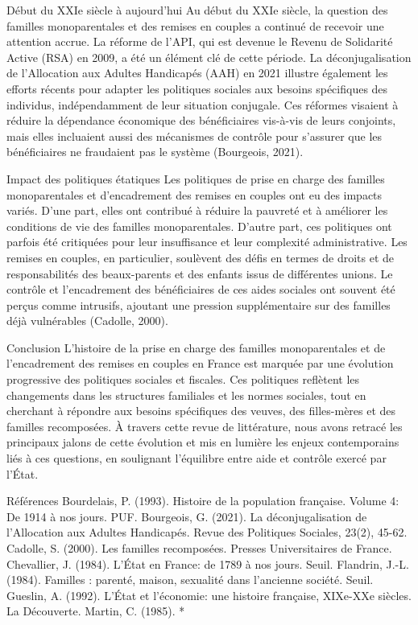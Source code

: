 \documentclass[
  12pt,
]{book}
\begin{document}
Début du XXIe siècle à aujourd'hui Au début du XXIe siècle, la question
des familles monoparentales et des remises en couples a continué de
recevoir une attention accrue. La réforme de l'API, qui est devenue le
Revenu de Solidarité Active (RSA) en 2009, a été un élément clé de cette
période. La déconjugalisation de l'Allocation aux Adultes Handicapés
(AAH) en 2021 illustre également les efforts récents pour adapter les
politiques sociales aux besoins spécifiques des individus,
indépendamment de leur situation conjugale. Ces réformes visaient à
réduire la dépendance économique des bénéficiaires vis-à-vis de leurs
conjoints, mais elles incluaient aussi des mécanismes de contrôle pour
s'assurer que les bénéficiaires ne fraudaient pas le système (Bourgeois,
2021).

Impact des politiques étatiques Les politiques de prise en charge des
familles monoparentales et d'encadrement des remises en couples ont eu
des impacts variés. D'une part, elles ont contribué à réduire la
pauvreté et à améliorer les conditions de vie des familles
monoparentales. D'autre part, ces politiques ont parfois été critiquées
pour leur insuffisance et leur complexité administrative. Les remises en
couples, en particulier, soulèvent des défis en termes de droits et de
responsabilités des beaux-parents et des enfants issus de différentes
unions. Le contrôle et l'encadrement des bénéficiaires de ces aides
sociales ont souvent été perçus comme intrusifs, ajoutant une pression
supplémentaire sur des familles déjà vulnérables (Cadolle, 2000).

Conclusion L'histoire de la prise en charge des familles monoparentales
et de l'encadrement des remises en couples en France est marquée par une
évolution progressive des politiques sociales et fiscales. Ces
politiques reflètent les changements dans les structures familiales et
les normes sociales, tout en cherchant à répondre aux besoins
spécifiques des veuves, des filles-mères et des familles recomposées. À
travers cette revue de littérature, nous avons retracé les principaux
jalons de cette évolution et mis en lumière les enjeux contemporains
liés à ces questions, en soulignant l'équilibre entre aide et contrôle
exercé par l'État.

Références Bourdelais, P. (1993). Histoire de la population française.
Volume 4: De 1914 à nos jours. PUF. Bourgeois, G. (2021). La
déconjugalisation de l'Allocation aux Adultes Handicapés. Revue des
Politiques Sociales, 23(2), 45-62. Cadolle, S. (2000). Les familles
recomposées. Presses Universitaires de France. Chevallier, J. (1984).
L'État en France: de 1789 à nos jours. Seuil. Flandrin, J.-L. (1984).
Familles : parenté, maison, sexualité dans l'ancienne société. Seuil.
Gueslin, A. (1992). L'État et l'économie: une histoire française,
XIXe-XXe siècles. La Découverte. Martin, C. (1985). *
\end{document}
